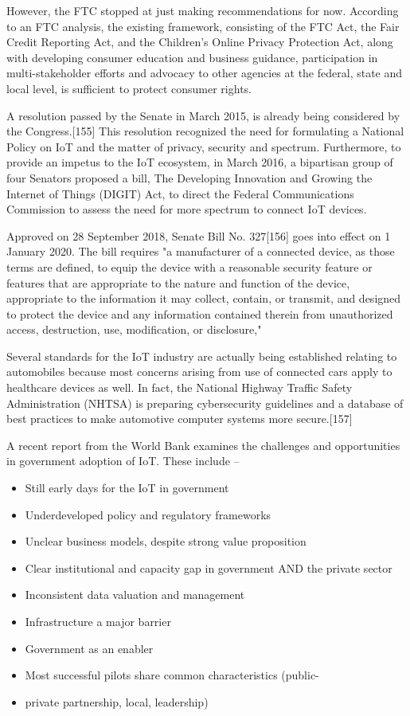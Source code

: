 \documentclass[12pt, a4paper, twoside]{article}
\begin{document}
However, the FTC stopped at just making recommendations for now. According to an FTC analysis, the existing framework, consisting of the FTC Act, the Fair Credit Reporting Act, and the Children's Online Privacy Protection Act, along with developing consumer education and business guidance, participation in multi-stakeholder efforts and advocacy to other agencies at the federal, state and local level, is sufficient to protect consumer rights.

A resolution passed by the Senate in March 2015, is already being considered by the Congress.[155] This resolution recognized the need for formulating a National Policy on IoT and the matter of privacy, security and spectrum. Furthermore, to provide an impetus to the IoT ecosystem, in March 2016, a bipartisan group of four Senators proposed a bill, The Developing Innovation and Growing the Internet of Things (DIGIT) Act, to direct the Federal Communications Commission to assess the need for more spectrum to connect IoT devices.

Approved on 28 September 2018, Senate Bill No. 327[156] goes into effect on 1 January 2020. The bill requires "a manufacturer of a connected device, as those terms are defined, to equip the device with a reasonable security feature or features that are appropriate to the nature and function of the device, appropriate to the information it may collect, contain, or transmit, and designed to protect the device and any information contained therein from unauthorized access, destruction, use, modification, or disclosure,"

Several standards for the IoT industry are actually being established relating to automobiles because most concerns arising from use of connected cars apply to healthcare devices as well. In fact, the National Highway Traffic Safety Administration (NHTSA) is preparing cybersecurity guidelines and a database of best practices to make automotive computer systems more secure.[157]

A recent report from the World Bank examines the challenges and opportunities in government adoption of IoT. These include –

\begin{itemize}
\item Still early days for the IoT in government 
\item Underdeveloped policy and regulatory frameworks 
\item Unclear business models, despite strong value proposition 
\item Clear institutional and capacity gap in government AND the private sector 
\item Inconsistent data valuation and management 
\item Infrastructure a major barrier 
\item Government as an enabler 
\item Most successful pilots share common characteristics (public-\item private partnership, local, leadership)
\end{itemize}
\end{document}
